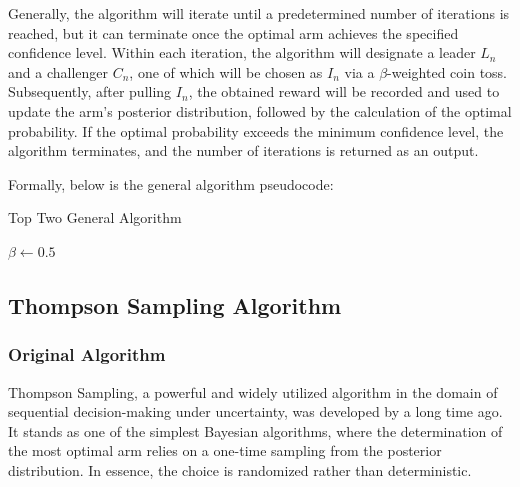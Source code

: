 \documentclass[a4paper, 12pt]{article}
\theoremstyle{definition}
\begin{document}
Generally, the algorithm will iterate until a predetermined number of iterations is reached, but it can terminate once the optimal arm achieves the specified confidence level. Within each iteration, the algorithm will designate a leader $L_n$ and a challenger $C_n$, one of which will be chosen as $I_n$ via a $\beta$-weighted coin toss. Subsequently, after pulling $I_n$, the obtained reward will be recorded and used to update the arm's posterior distribution, followed by the calculation of the optimal probability. If the optimal probability exceeds the minimum confidence level, the algorithm terminates, and the number of iterations is returned as an output.

Formally, below is the general algorithm pseudocode:

\begin{algorithm}
\caption{Top Two General Algorithm}\label{alg:cap}
$\beta\gets 0.5$\;
\end{algorithm}


\subsection{Thompson Sampling Algorithm}
\subsubsection{Original Algorithm}
Thompson Sampling, a powerful and widely utilized algorithm in the domain of sequential decision-making under uncertainty, was developed by \cite{ts} a long time ago. It stands as one of the simplest Bayesian algorithms, where the determination of the most optimal arm relies on a one-time sampling from the posterior distribution. In essence, the choice is randomized rather than deterministic.
\end{document}
